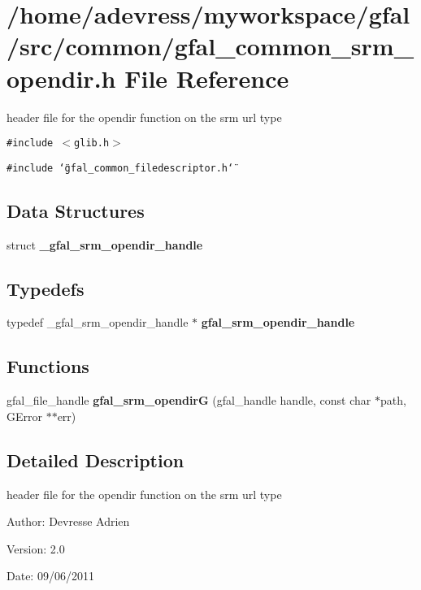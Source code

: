\section{/home/adevress/myworkspace/gfal/src/common/gfal\_\-common\_\-srm\_\-opendir.h File Reference}
\label{gfal__common__srm__opendir_8h}
header file for the opendir function on the srm url type 

{\tt \#include $<$glib.h$>$}\par
{\tt \#include \char`\"{}gfal\_\-common\_\-filedescriptor.h\char`\"{}}\par
\subsection*{Data Structures}
\begin{CompactItemize}
\item 
struct \textbf{\_\-gfal\_\-srm\_\-opendir\_\-handle}
\end{CompactItemize}
\subsection*{Typedefs}
\begin{CompactItemize}
\item 
typedef \_\-gfal\_\-srm\_\-opendir\_\-handle $\ast$ \textbf{gfal\_\-srm\_\-opendir\_\-handle}\label{gfal__common__srm__opendir_8h_824f5b93bbf97b9fed247ce0d6603a2c}

\end{CompactItemize}
\subsection*{Functions}
\begin{CompactItemize}
\item 
gfal\_\-file\_\-handle \textbf{gfal\_\-srm\_\-opendir\-G} (gfal\_\-handle handle, const char $\ast$path, GError $\ast$$\ast$err)\label{gfal__common__srm__opendir_8h_3cf645c42428854975e385025b020285}

\end{CompactItemize}


\subsection{Detailed Description}
header file for the opendir function on the srm url type 

\begin{Desc}
\item[Author:]Devresse Adrien \end{Desc}
\begin{Desc}
\item[Version:]2.0 \end{Desc}
\begin{Desc}
\item[Date:]09/06/2011 \end{Desc}
